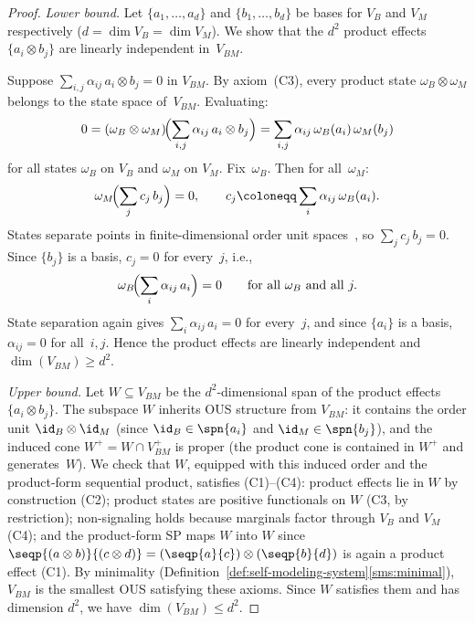 \begin{proof}
\emph{Lower bound.}
Let $\{a_1,\ldots,a_d\}$ and $\{b_1,\ldots,b_d\}$ be bases for
$V_B$ and $V_M$ respectively ($d = \dim V_B = \dim V_M$).
We show that the $d^2$ product effects
$\{a_i \otimes b_j\}$ are linearly independent in~$V_{BM}$.

Suppose $\sum_{i,j} \alpha_{ij}\, a_i \otimes b_j = 0$ in $V_{BM}$.
By axiom~(C3), every product state $\omega_B \otimes \omega_M$
belongs to the state space of~$V_{BM}$.  Evaluating:
\[
  0 = (\omega_B \otimes \omega_M)\!\Bigl(\sum_{i,j} \alpha_{ij}\,
  a_i \otimes b_j\Bigr)
  = \sum_{i,j} \alpha_{ij}\, \omega_B(a_i)\, \omega_M(b_j)
\]
for all states $\omega_B$ on $V_B$ and $\omega_M$ on $V_M$.
Fix~$\omega_B$.  Then for all~$\omega_M$:
\[
  \omega_M\!\Bigl(\sum_j c_j\, b_j\Bigr) = 0,
  \qquad c_j \coloneqq \sum_i \alpha_{ij}\, \omega_B(a_i).
\]
States separate points in finite-dimensional order unit
spaces~\cite{AlfsenShultz2003}, so $\sum_j c_j\, b_j = 0$.
Since $\{b_j\}$ is a basis, $c_j = 0$ for every~$j$, i.e.,
\[
  \omega_B\!\Bigl(\sum_i \alpha_{ij}\, a_i\Bigr) = 0
  \qquad \text{for all } \omega_B \text{ and all } j.
\]
State separation again gives $\sum_i \alpha_{ij}\, a_i = 0$ for
every~$j$, and since $\{a_i\}$ is a basis, $\alpha_{ij} = 0$ for
all~$i, j$.  Hence the product effects are linearly independent and
$\dim(V_{BM}) \ge d^2$.

\emph{Upper bound.}
Let $W \subseteq V_{BM}$ be the $d^2$-dimensional span of the product
effects $\{a_i \otimes b_j\}$.  The subspace $W$ inherits OUS
structure from $V_{BM}$: it contains the order unit
$\id_B \otimes \id_M$ (since $\id_B \in \spn\{a_i\}$ and
$\id_M \in \spn\{b_j\}$), and the induced cone
$W^+ = W \cap V_{BM}^+$ is proper (the product cone is contained
in $W^+$ and generates~$W$).  We check that $W$, equipped with this
induced order and the product-form sequential product, satisfies
(C1)--(C4): product effects lie in $W$ by construction (C2);
product states are positive functionals on $W$ (C3, by restriction);
non-signaling holds because marginals factor through $V_B$ and $V_M$
(C4); and the product-form SP maps $W$ into $W$ since
$\seqp{(a \otimes b)}{(c \otimes d)} = (\seqp{a}{c}) \otimes
(\seqp{b}{d})$ is again a product effect (C1).
By minimality (Definition~\ref{def:self-modeling-system}\ref{sms:minimal}),
$V_{BM}$ is the smallest OUS satisfying these axioms.  Since $W$
satisfies them and has dimension $d^2$,
we have $\dim(V_{BM}) \le d^2$.
\end{proof}

